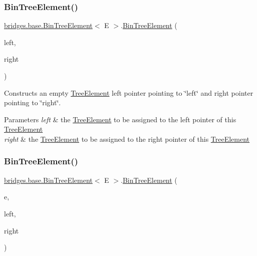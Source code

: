 \subsubsection{\texorpdfstring{Bin\+Tree\+Element()}{BinTreeElement()}\hspace{0.1cm}{\footnotesize\ttfamily [4/5]}}
{\footnotesize\ttfamily \hyperlink{classbridges_1_1base_1_1_bin_tree_element}{bridges.\+base.\+Bin\+Tree\+Element}$<$ E $>$.\hyperlink{classbridges_1_1base_1_1_bin_tree_element}{Bin\+Tree\+Element} (\begin{DoxyParamCaption}\item[{\hyperlink{classbridges_1_1base_1_1_bin_tree_element}{Bin\+Tree\+Element}$<$ E $>$}]{left,  }\item[{\hyperlink{classbridges_1_1base_1_1_bin_tree_element}{Bin\+Tree\+Element}$<$ E $>$}]{right }\end{DoxyParamCaption})}

Constructs an empty \hyperlink{classbridges_1_1base_1_1_tree_element}{Tree\+Element} left pointer pointing to \char`\"{}left\char`\"{} and right pointer pointing to \char`\"{}right\char`\"{}.


\begin{DoxyParams}{Parameters}
{\em left} & the \hyperlink{classbridges_1_1base_1_1_tree_element}{Tree\+Element} to be assigned to the left pointer of this \hyperlink{classbridges_1_1base_1_1_tree_element}{Tree\+Element} \\
\hline
{\em right} & the \hyperlink{classbridges_1_1base_1_1_tree_element}{Tree\+Element} to be assigned to the right pointer of this \hyperlink{classbridges_1_1base_1_1_tree_element}{Tree\+Element} \\
\hline
\end{DoxyParams}
\mbox{\label{classbridges_1_1base_1_1_bin_tree_element_a37f3def3cdf4a9eccf577d0ff3c704e9}} 
\subsubsection{\texorpdfstring{Bin\+Tree\+Element()}{BinTreeElement()}\hspace{0.1cm}{\footnotesize\ttfamily [5/5]}}
{\footnotesize\ttfamily \hyperlink{classbridges_1_1base_1_1_bin_tree_element}{bridges.\+base.\+Bin\+Tree\+Element}$<$ E $>$.\hyperlink{classbridges_1_1base_1_1_bin_tree_element}{Bin\+Tree\+Element} (\begin{DoxyParamCaption}\item[{E}]{e,  }\item[{\hyperlink{classbridges_1_1base_1_1_bin_tree_element}{Bin\+Tree\+Element}$<$ E $>$}]{left,  }\item[{\hyperlink{classbridges_1_1base_1_1_bin_tree_element}{Bin\+Tree\+Element}$<$ E $>$}]{right }\end{DoxyParamCaption})}

